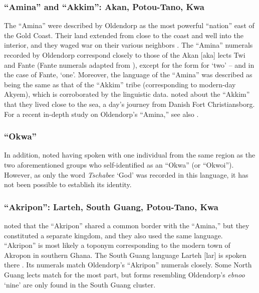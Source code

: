 \documentclass[output=paper,colorlinks,citecolor=brown]{langscibook}
\begin{document}
\subsubsection{``Amina'' and ``Akkim'': Akan, Potou-Tano, Kwa}

The ``Amina'' were described by Oldendorp as the most powerful ``nation'' east of the Gold Coast. Their land extended from close to the coast and well into the interior, and they waged war on their various neighbors \citep[383]{Oldendorp_2000}. The ``Amina'' numerals recorded by Oldendorp correspond closely to those of the Akan [aka] lects Twi and Fante (Fante numerals adapted from \cite{Bureau_of_Ghana_Languages_1986}), except for the form for `two' – and in the case of Fante, ‘one’. Moreover, the language of the ``Amina'' was described as being the same as that of the ``Akkim'' tribe (corresponding to modern-day Akyem), which is corroborated by the linguistic data. \citet[392]{Oldendorp_2000} noted about the ``Akkim'' that they lived close to the sea, a day’s journey from Danish Fort Christiansborg. For a recent in-depth study on Oldendorp's ``Amina,'' see also \citet[]{KelleyLovejoy_2023}.

\subsubsection{``Okwa''}

In addition, \citet[396]{Oldendorp_2000} noted having spoken with one individual from the same region as the two aforementioned groups who self-identified as an ``Okwa'' (or ``Okwoi''). However, as only the word \emph{Tschabee} `God' was recorded in this language, it has not been possible to establish its identity.

\subsubsection{``Akripon'': Larteh, South Guang, Potou-Tano, Kwa}

\citet[395]{Oldendorp_2000} noted that the ``Akripon'' shared a common border with the ``Amina,'' but they constituted a separate kingdom, and they also used the same language. ``Akripon'' is most likely a toponym corresponding to the modern town of Akropon in southern Ghana. The South Guang language Larteh [lar] is spoken there \citep{Bello_2013}. Its numerals match Oldendorp's ``Akripon'' numerals closely. Some North Guang lects match for the most part, but forms resembling Oldendorp's \emph{ebnoo} `nine' are only found in the South Guang cluster.
\end{document}
